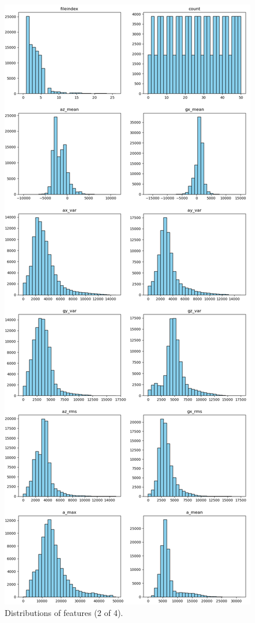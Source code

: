 \documentclass[10pt,twocolumn]{article}
\begin{document}
\begin{figure}[H]
    \centering
    \includegraphics[width=0.85\linewidth, height=0.4\textheight]{images/distribution_2_1.png}
    \caption{Distributions of features (2 of 4).}
    \label{fig:distribution-2-1}
\end{figure}
\end{document}
